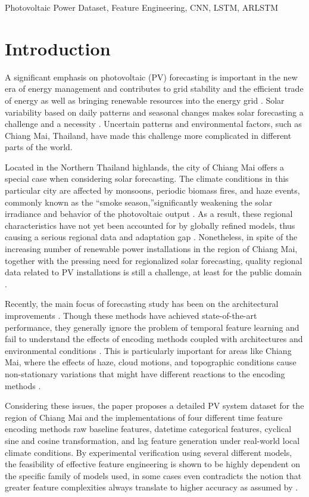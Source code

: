 \documentclass[conference]{IEEEtran}
\begin{document}
	\begin{IEEEkeywords}
		Photovoltaic Power Dataset, Feature Engineering, CNN, LSTM, ARLSTM
	\end{IEEEkeywords}
	
	\section{Introduction}
	A significant emphasis on photovoltaic (PV) forecasting is important in the new era of energy management and contributes to grid stability and the efficient trade of energy as well as bringing renewable resources into the energy grid \cite{Ahmed2020}. Solar variability based on daily patterns and seasonal changes makes solar forecasting a challenge and a necessity \cite{Antonanzas2016}. Uncertain patterns and environmental factors, such as Chiang Mai, Thailand, have made this challenge more complicated in different parts of the world.
	
	Located in the Northern Thailand highlands, the city of Chiang Mai offers a special case when considering solar forecasting. The climate conditions in this particular city are affected by monsoons, periodic biomass fires, and haze events, commonly known as the ``smoke season,''significantly weakening the solar irradiance and behavior of the photovoltaic output \cite{Amnuaylojaroen2020}. As a result, these regional characteristics have not yet been accounted for by globally refined models, thus causing a serious regional data and adaptation gap \cite{Seng2021}. Nonetheless, in spite of the increasing number of renewable power installations in the region of Chiang Mai, together with the pressing need for regionalized solar forecasting, quality regional data related to PV installations is still a challenge, at least for the public domain \cite{ASEAN2022}.
	
	Recently, the main focus of forecasting study has been on the architectural improvements \cite{Wang2022}. Though these methods have achieved state-of-the-art performance, they generally ignore the problem of temporal feature learning and fail to understand the effects of encoding methods coupled with architectures and environmental conditions \cite{Cerqueira2020}. This is particularly important for areas like Chiang Mai, where the effects of haze, cloud motions, and topographic conditions cause non-stationary variations that might have different reactions to the encoding methods \cite{Prasertsan2021}.
	
	Considering these issues, the paper proposes a detailed PV system dataset for the region of Chiang Mai and the implementations of four different time feature encoding methods raw baseline features, datetime categorical features, cyclical sine and cosine transformation, and lag feature generation under real-world local climate conditions. By experimental verification using several different models, the feasibility of effective feature engineering is shown to be highly dependent on the specific family of models used, in some cases even contradicts the notion that greater feature complexities always translate to higher accuracy as assumed by \cite{Bommes2021}.
	
\end{document}
